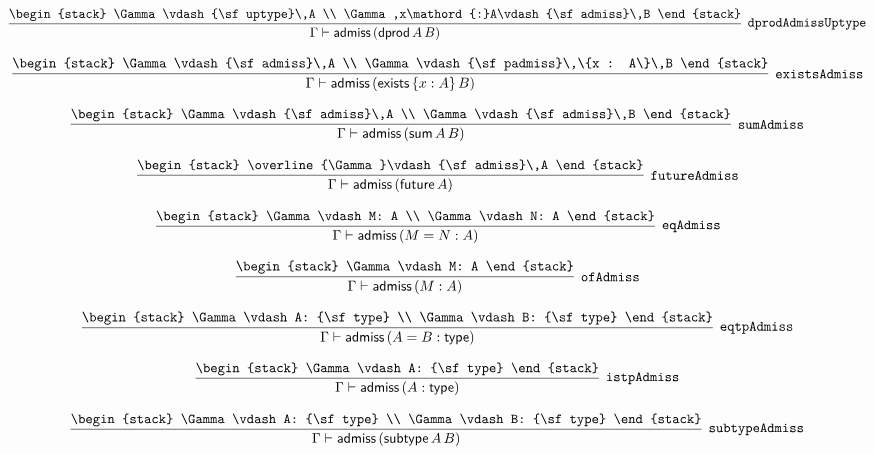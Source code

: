 \[
\infer[{\tt dprodAdmissUptype}]{\Gamma \vdash {\sf admiss}\,({\sf dprod}\,A\,B)}{
\begin{stack}
\Gamma \vdash {\sf uptype}\,A
\\
\Gamma ,x\mathord{:}A\vdash {\sf admiss}\,B
\end{stack}}
\]

\[
\infer[{\tt existsAdmiss}]{\Gamma \vdash {\sf admiss}\,({\sf exists}\,\{x : A\}\,B)}{
\begin{stack}
\Gamma \vdash {\sf admiss}\,A
\\
\Gamma \vdash {\sf padmiss}\,\{x : A\}\,B
\end{stack}}
\]

\[
\infer[{\tt sumAdmiss}]{\Gamma \vdash {\sf admiss}\,({\sf sum}\,A\,B)}{
\begin{stack}
\Gamma \vdash {\sf admiss}\,A
\\
\Gamma \vdash {\sf admiss}\,B
\end{stack}}
\]

\[
\infer[{\tt futureAdmiss}]{\Gamma \vdash {\sf admiss}\,({\sf future}\,A)}{
\begin{stack}
\overline{\Gamma}\vdash {\sf admiss}\,A
\end{stack}}
\]

\[
\infer[{\tt eqAdmiss}]{\Gamma \vdash {\sf admiss}\,(M= N: A)}{
\begin{stack}
\Gamma \vdash M: A
\\
\Gamma \vdash N: A
\end{stack}}
\]

\[
\infer[{\tt ofAdmiss}]{\Gamma \vdash {\sf admiss}\,(M: A)}{
\begin{stack}
\Gamma \vdash M: A
\end{stack}}
\]

\[
\infer[{\tt eqtpAdmiss}]{\Gamma \vdash {\sf admiss}\,(A= B: {\sf type})}{
\begin{stack}
\Gamma \vdash A: {\sf type}
\\
\Gamma \vdash B: {\sf type}
\end{stack}}
\]

\[
\infer[{\tt istpAdmiss}]{\Gamma \vdash {\sf admiss}\,(A: {\sf type})}{
\begin{stack}
\Gamma \vdash A: {\sf type}
\end{stack}}
\]

\[
\infer[{\tt subtypeAdmiss}]{\Gamma \vdash {\sf admiss}\,({\sf subtype}\,A\,B)}{
\begin{stack}
\Gamma \vdash A: {\sf type}
\\
\Gamma \vdash B: {\sf type}
\end{stack}}
\]

